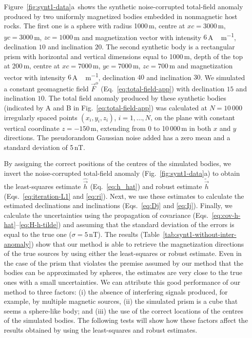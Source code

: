 \documentclass[journal abbreviation, npg]{copernicus}
\begin{document}
Figure~\ref{fig:synt1-data}a~shows the synthetic noise-corrupted total-field
anomaly produced by two uniformly magnetized bodies embedded in nonmagnetic
host rocks. The first one is a sphere with radius 1000\,\unit{m}, centre at
$xc = 3000$\,\unit{m}, $yc = 3000$\,\unit{m}, $zc = 1000$\,\unit{m} and
magnetization vector with intensity $6$\,\unit{A\,m^{-1}}, declination
$10${\degree} and inclination $20${\degree}. The second synthetic body is
a rectangular prism with horizontal and vertical dimensions equal to
1000\,\unit{m}, depth of the top at 200\,\unit{m}, centre at $xc =
7000$\,\unit{m}, $yc = 7000$\,\unit{m}, $zc = 700$\,\unit{m} and
magnetization vector with intensity $6$\,\unit{A\,m^{-1}}, declination
$40${\degree} and inclination $30${\degree}. We simulated a constant
geomagnetic field $\vec{F}^\mathrm{o}$ (Eq.~\ref{eq:total-field-app}) with
declination $15${\degree} and inclination $10${\degree}. The total field
anomaly produced by these synthetic bodies (indicated by A and B in
Fig.~\ref{eq:total-field-app}) was calculated at $N = 10\,000$ irregularly
spaced points $(x_{i}, y_{i}, z_{i})$, $i = 1, \ldots, N$, on the plane with
constant vertical coordinate $z=-150$\,\unit{m}, extending from 0 to
10\,000\,\unit{m} in both $x$ and $y$ directions. The pseudorandom Gaussian
noise added has a zero mean and a standard deviation of 5\,nT.

By assigning the correct positions of the centres of the simulated bodies, we
invert the noise-corrupted total-field anomaly (Fig.~\ref{fig:synt1-data}a)
to obtain the least-squares estimate $\hat{\vec{h}}$ (Eq.~\ref{eq:h_hat}) and
robust estimate $\tilde{\vec{h}}$ (Eqs.~\ref{eq:iteration-L1} and
\ref{eq:ri}). Next, we use these estimates to calculate the estimated
declinations and inclinations (Eqs.~\ref{eq:Dj} and \ref{eq:Ij}). Finally, we
calculate the uncertainties using the propagation of covariance
(Eqs.~\ref{eq:cov-h-hat}--\ref{eq:H-h-tilde}) and assuming that the standard
deviation of the errors is equal to the true one ($\sigma = 5$\,nT). The
results (Table~\ref{tab:synt1-without-inter-anomaly}) show that our method is
able to retrieve the magnetization directions of the true sources by using
either the least-squares or robust estimate. Even in the case of the prism
that violates the premise assumed by our method that the bodies can be
approximated by spheres, the estimates are very close to the true ones with
a small uncertainties. We can attribute this good performance of our method
to three factors: (i) the absence of interfering signals produced, for
example, by multiple magnetic sources, (ii) the simulated prism is a cube
that seems a sphere-like body; and (iii) the use of the correct locations of
the centres of the simulated bodies. The following tests will show how these
factors affect the results obtained by using the least-squares and robust
estimates.
\end{document}
